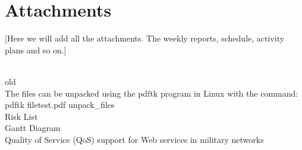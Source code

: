 \section{Attachments}\label{Attachments} 

    [Here we will add all the attachments. The weekly reports, schedule, activity plans and so on.]


    \\ old\\
The files can be unpacked using the pdftk program in Linux with the command: 
    pdftk filetest.pdf unpack\_files \\
     Risk List \\
     Gantt Diagram \\
     Quality of Service (QoS) support for Web services in military networks \\
    
